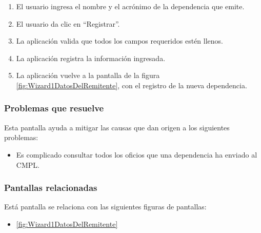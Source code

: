 	\begin{enumerate}
		\item El usuario ingresa el nombre y el acrónimo de la dependencia que emite.
		\item El usuario da clic en ``Registrar''.
		\item La aplicación valida que todos los campos requeridos estén llenos.
		\item La aplicación registra la información ingresada.
		\item La aplicación vuelve a la pantalla de la figura \ref{fig:Wizard1DatosDelRemitente}, con el registro de la nueva dependencia.
	\end{enumerate}

\subsubsection{Problemas que resuelve}
Esta pantalla ayuda a mitigar las causas que dan origen a los siguientes problemas:

	\begin{itemize}
		\item Es complicado consultar todos los oficios que una dependencia ha enviado al CMPL.
	\end{itemize}

\subsubsection{Pantallas relacionadas}
Está pantalla se relaciona con las siguientes figuras de pantallas:
	\begin{itemize}
		\item \ref{fig:Wizard1DatosDelRemitente}
	\end{itemize}